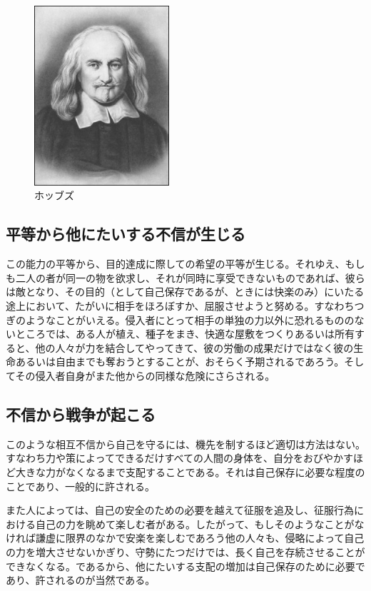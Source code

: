   \begin{figure}[htbp]
    \centering
      \includegraphics[width=50mm]{images/Thomas-Hobbes2.jpg}
    \caption{ホッブズ}
  \end{figure}



\subsection{平等から他にたいする不信が生じる}


この能力の平等から、目的達成に際しての希望の平等が生じる。それゆえ、もしも二人の者が同一の物を欲求し、それが同時に享受できないものであれば、彼らは敵となり、その目的（として自己保存であるが、ときには快楽のみ）にいたる途上において、たがいに相手をほろぼすか、屈服させようと努める。すなわちつぎのようなことがいえる。侵入者にとって相手の単独の力以外に恐れるもののないところでは、ある人が植え、種子をまき、快適な屋敷をつくりあるいは所有すると、他の人々が力を結合してやってきて、彼の労働の成果だけではなく彼の生命あるいは自由までも奪おうとすることが、おそらく予期されるであろう。そしてその侵入者自身がまた他からの同様な危険にさらされる。




\subsection{不信から戦争が起こる}




このような相互不信から自己を守るには、機先を制するほど適切は方法はない。すなわち力や策によってできるだけすべての人間の身体を、自分をおびやかすほど大きな力がなくなるまで支配することである。それは自己保存に必要な程度のことであり、一般的に許される。



また人によっては、自己の安全のための必要を越えて征服を追及し、征服行為における自己の力を眺めて楽しむ者がある。したがって、もしそのようなことがなければ謙虚に限界のなかで安楽を楽しむであろう他の人々も、侵略によって自己の力を増大させないかぎり、守勢にたつだけでは、長く自己を存続させることができなくなる。であるから、他にたいする支配の増加は自己保存のために必要であり、許されるのが当然である。



